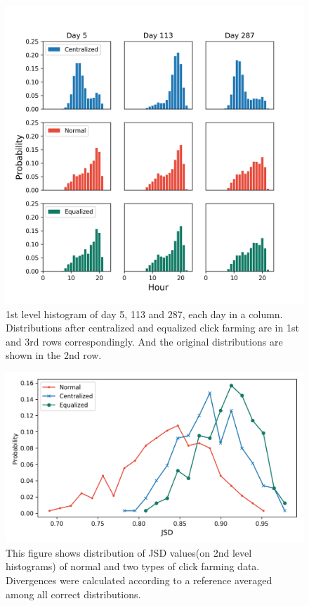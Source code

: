 \documentclass[10pt,conference,letterpaper]{article}
\begin{document}
			\begin{figure}[!t]
				\centering
				\includegraphics[width=\linewidth]{fig/Raw1stLevelHist.png}
				\caption{1st level histogram of day 5, 113 and 287, each day in a column. Distributions after centralized and equalized click farming are in 1st and 3rd rows correspondingly. And the original distributions are shown in the 2nd row.}
				\label{fig:raw-hist-1st}
			\end{figure}
	
			\begin{figure}[!t]
				\centering
				\includegraphics[width=\linewidth]{fig/RawOverview2nd.png}
				\caption{This figure shows distribution of JSD values(on 2nd level histograms) of normal and two types of click farming data. Divergences were calculated according to a reference averaged among all correct distributions.}
				\label{fig:raw-overview}
			\end{figure}
	
\end{document}
